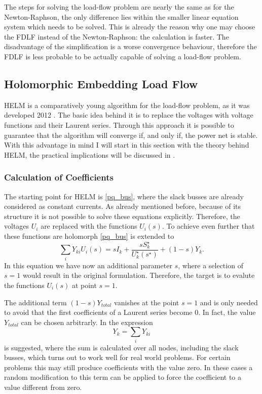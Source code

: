 The steps for solving the load-flow problem are nearly the same as for the Newton-Raphson, the only difference lies within the smaller linear equation system which needs to be solved. This is already the reason why one may choose the FDLF instead of the Newton-Raphson: the calculation is faster. The disadvantage of the simplification is a worse convergence behaviour, therefore the FDLF is less probable to be actually capable of solving a load-flow problem.

\subsection{Holomorphic Embedding Load Flow}
\label{sec:helm}

HELM is a comparatively young algorithm for the load-flow problem, as it was developed 2012 \citep{helmIEEE}. The basic idea behind it is to replace the voltages with voltage functions and their Laurent series. Through this approach it is possible to guarantee that the algorithm will converge if, and only if, the power net is stable. With this advantage in mind I will start in this section with the theory behind HELM, the practical implications will be discussed in .

\subsubsection{Calculation of Coefficients}

The starting point for HELM is \eqref{pq_bus}, where the slack busses are already considered as constant currents. As already mentioned before, because of its structure it is not possible to solve these equations explicitly. Therefore, the voltages $U_i$ are replaced with the functions $U_i(s)$. To achieve even further that these functions are holomorph \citep{helmPatentSept2009} \eqref{pq_bus} is extended to
\begin{equation}	
		\sum_i Y_{ki} U_{i}(s) = s I_k + \frac{s S_k^\star}{U_k^\star(s^\star)} + (1 - s) Y_k.
		\label{eq:pq_bus_embedded}
\end{equation}
In this equation we have now an additional parameter $s$, where a selection of $s = 1$ would result in the original formulation. Therefore, the target is to evalute the functions $U_i(s)$ at point $s = 1$.

The additional term $(1 - s) Y_{total}$ vanishes at the point $s = 1$ and is only needed to avoid that the first coefficients of a Laurent series become 0. In fact, the value $Y_{total}$ can be chosen arbitrarly. In \citep{helmPatentSept2009} the expression
\begin{equation}
	Y_k = \sum_i Y_{ki}
\end{equation}
is suggested, where the sum is calculated over all nodes, including the slack busses, which turns out to work well for real world problems. For certain problems this may still produce coefficients with the value zero. In these cases a random modification to this term can be applied to force the coefficient to a value different from zero.

